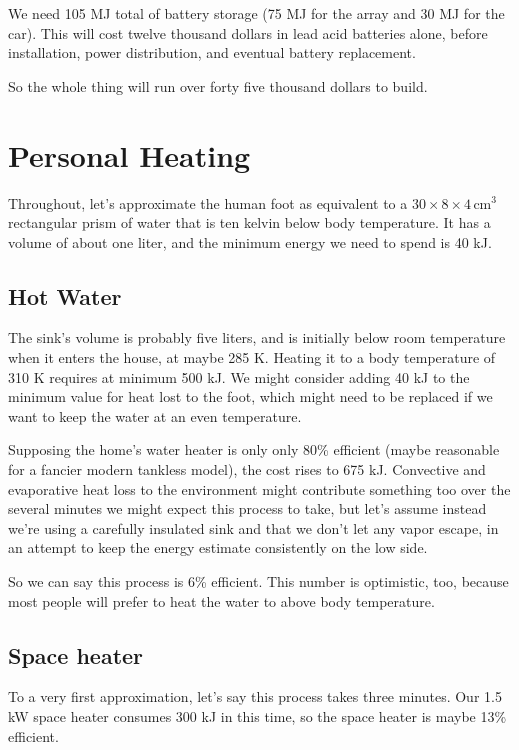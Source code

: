 \documentclass[12pt]{article}
\begin{document}
We need 105 MJ total of battery storage (75 MJ for the array and 30 MJ for the car). This will cost twelve thousand dollars in lead acid batteries alone, before installation, power distribution, and eventual battery replacement.

So the whole thing will run over forty five thousand dollars to build.


\section{Personal Heating}

Throughout, let's approximate the human foot as equivalent to a \(30 \times 8 \times 4\, \mathrm{cm}^3\) rectangular prism of water that is ten kelvin below body temperature. It has a volume of about one liter, and the minimum energy we need to spend is 40 kJ.

\subsection{Hot Water}

The sink's volume is probably five liters, and is initially below room temperature when it enters the house, at maybe 285 K. Heating it to a body temperature of 310 K requires at minimum 500 kJ. We might consider adding 40 kJ to the minimum value for heat lost to the foot, which might need to be replaced if we want to keep the water at an even temperature.

Supposing the home's water heater is only only 80\% efficient (maybe reasonable for a fancier modern tankless model), the cost rises to 675 kJ. Convective and evaporative heat loss to the environment might contribute something too over the several minutes we might expect this process to take, but let's assume instead we're using a carefully insulated sink and that we don't let any vapor escape, in an attempt to keep the energy estimate consistently on the low side.

So we can say this process is 6\% efficient. This number is optimistic, too, because most people will prefer to heat the water to above body temperature.

\subsection{Space heater}

To a very first approximation, let's say this process takes three minutes. Our 1.5 kW space heater consumes 300 kJ in this time, so the space heater is maybe 13\% efficient.
\end{document}

